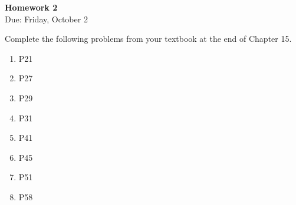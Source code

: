 \documentclass{article}
\begin{document}
\fancyfoot[C]{\thepage}
\vspace*{0cm}
\begin{center}
	{\LARGE \textbf{Homework 2}}\\
	\vspace{0.25cm}
	{\Large Due: Friday, October 2}
\end{center}

Complete the following problems from your textbook at the end of Chapter 15.
\begin{enumerate}
\item P21
\item P27
\item P29
\item P31
\item P41
\item P45
\item P51
\item P58
\end{enumerate}
\end{document}
